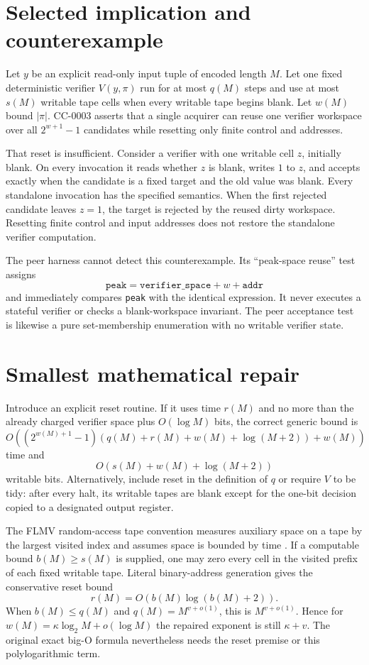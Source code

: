 \documentclass[11pt]{article}
\begin{document}
\section{Selected implication and counterexample}
Let $y$ be an explicit read-only input tuple of encoded length $M$.  Let one
fixed deterministic verifier $V(y,\pi)$ run for at most $q(M)$ steps and use
at most $s(M)$ writable tape cells when every writable tape begins blank.
Let $w(M)$ bound $|\pi|$.  CC-0003 asserts that a single acquirer can reuse
one verifier workspace over all $2^{w+1}-1$ candidates while resetting only
finite control and addresses.

That reset is insufficient.  Consider a verifier with one writable cell
$z$, initially blank.  On every invocation it reads whether $z$ is blank,
writes $1$ to $z$, and accepts exactly when the candidate is a fixed target
and the old value was blank.  Every standalone invocation has the specified
semantics.  When the first rejected candidate leaves $z=1$, the target is
rejected by the reused dirty workspace.  Resetting finite control and input
addresses does not restore the standalone verifier computation.

The peer harness cannot detect this counterexample.  Its ``peak-space
reuse'' test assigns
\[
 \texttt{peak}=\texttt{verifier\_space}+w+\texttt{addr}
\]
and immediately compares \texttt{peak} with the identical expression.  It
never executes a stateful verifier or checks a blank-workspace invariant.
The peer acceptance test is likewise a pure set-membership enumeration with
no writable verifier state.

\section{Smallest mathematical repair}
Introduce an explicit reset routine.  If it uses time $r(M)$ and no more
than the already charged verifier space plus $O(\log M)$ bits, the correct
generic bound is
\[
 O\!\left((2^{w(M)+1}-1)
       (q(M)+r(M)+w(M)+\log(M+2))+w(M)\right)
\]
time and
\[
 O(s(M)+w(M)+\log(M+2))
\]
writable bits.  Alternatively, include reset in the definition of $q$ or
require $V$ to be tidy: after every halt, its writable tapes are blank except
for the one-bit decision copied to a designated output register.

The FLMV random-access tape convention measures auxiliary space on a tape by
the largest visited index and assumes space is bounded by time
\cite{flmv,diehl}.  If a computable bound $b(M)\ge s(M)$ is supplied, one may
zero every cell in the visited prefix of each fixed writable tape.  Literal
binary-address generation gives the conservative reset bound
\[
 r(M)=O(b(M)\log(b(M)+2)).
\]
When $b(M)\le q(M)$ and $q(M)=M^{v+o(1)}$, this is
$M^{v+o(1)}$.  Hence for
$w(M)=\kappa\log_2M+o(\log M)$ the repaired exponent is still
$\kappa+v$.  The original exact big-O formula nevertheless needs the reset
premise or this polylogarithmic term.
\end{document}
